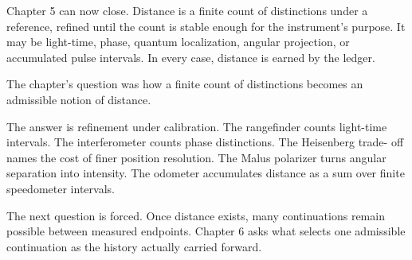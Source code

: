 Chapter 5 can now close. Distance is a finite count of distinctions under a
reference, refined until the count is stable enough for the instrument's
purpose. It may be light-time, phase, quantum localization, angular projection,
or accumulated pulse intervals. In every case, distance is earned by the
ledger.

\begin{bridge}

The chapter's question was how a finite count of distinctions becomes an
admissible notion of distance.

The answer is refinement under calibration. The rangefinder counts light-time
intervals. The interferometer counts phase distinctions. The Heisenberg trade-
off names the cost of finer position resolution. The Malus polarizer turns
angular separation into intensity. The odometer accumulates distance as a sum
over finite speedometer intervals.

The next question is forced. Once distance exists, many continuations remain
possible between measured endpoints. Chapter 6 asks what selects one admissible
continuation as the history actually carried forward.

\end{bridge}

